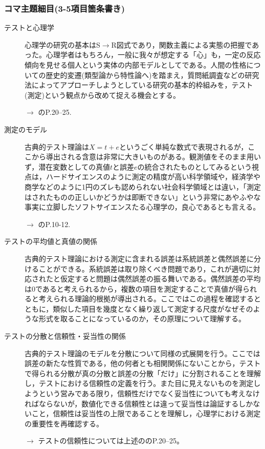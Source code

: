 \subsubsection{コマ主題細目(3-5項目箇条書き)}
\begin{description}
	\item[テストと心理学]心理学の研究の基本はS$\to$R図式であり，関数主義による実態の把握であった。心理学者はもちろん，一般に我々が想定する「心」も，一定の反応傾向を見せる個人という実体の内部モデルとしてである。人間の性格についての歴史的変遷(類型論から特性論へ)を踏まえ，質問紙調査などの研究法によってアプローチしようとしている研究の基本的枠組みを，テスト(測定)という観点から改めて捉える機会とする。
	      \begin{flushright}
		      $\to$ \textcite{kosugi2016b}のP.20--25.
	      \end{flushright}

	\item[測定のモデル]古典的テスト理論は$X=t+e$というごく単純な数式で表現されるが，ここから導出される含意は非常に大きいものがある。観測値をそのまま用いず，潜在変数としての真値$t$と誤差$e$の統合されたものとしてみるという視点は，ハードサイエンスのように測定の精度が高い科学領域や，経済学や商学などのように1円のズレも認められない社会科学領域とは違い，「測定はされたものの正しいかどうかは即断できない」という非常にあやふやな事実に立脚したソフトサイエンスたる心理学の，良心であるとも言える。
	      \begin{flushright}
		      $\to$ \textcite{Kumagai201508}のP.10-12.
	      \end{flushright}

	\item[テストの平均値と真値の関係]古典的テスト理論における測定に含まれる誤差は系統誤差と偶然誤差に分けることができる。系統誤差は取り除くべき問題であり，これが適切に対応されたと仮定すると問題は偶然誤差の振る舞いである。偶然誤差の平均は0であると考えられるから，複数の項目を測定することで真値が得られると考えられる理論的根拠が導出される。ここではこの過程を確認するとともに，類似した項目を幾度となく繰り返して測定する尺度がなぜそのような形式を取ることになっているのか，その原理について理解する。

	\item[テストの分散と信頼性・妥当性の関係]古典的テスト理論のモデルを分散について同様の式展開を行う。ここでは誤差の新たな性質である，他の何者とも相関関係にないことから，テストで得られる分散が真の分散と誤差の分散「だけ」に分割されることを理解し，テストにおける信頼性の定義を行う。また目に見えないものを測定しようという営みである限り，信頼性だけでなく妥当性についても考えなければならないが，数値化できる信頼性とは違って妥当性は論証するしかないこと，信頼性は妥当性の上限であることを理解し，心理学における測定の重要性を再確認する。
	      \begin{flushright}
		      $\to$ テストの信頼性については上述の\textcite{kosugi2016b}のP.20--25。
	      \end{flushright}

\end{description}
